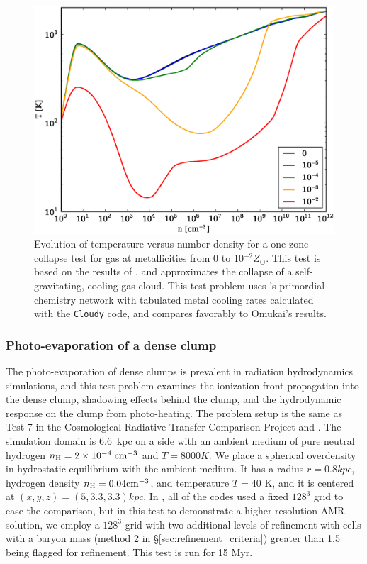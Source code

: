 \begin{figure}
  \begin{center}
    \includegraphics[width=1.0\textwidth]{figures/OneZoneCollapseTest.eps}
  \end{center}
  \caption{Evolution of temperature versus number density for a
one-zone collapse test for gas at metallicities from 0 to 10$^{-2}
Z_{\odot}$.  This test is based on the results of
\citet{2005ApJ...626..627O}, and approximates the collapse of a
self-gravitating, cooling gas cloud.  This test problem uses \enzo's
primordial chemistry network with tabulated metal cooling rates
calculated with the \texttt{Cloudy} code, and compares favorably to
Omukai's results.}
  \label{fig.onezone}
\end{figure}


\subsubsection{Photo-evaporation of a dense clump}
\label{sec.tests.raytracing}

The photo-evaporation of dense clumps is prevalent in radiation
hydrodynamics simulations, and this test problem examines the
ionization front propagation into the dense clump, shadowing effects
behind the clump, and the hydrodynamic response on the clump from
photo-heating.  The problem setup is the same as Test 7 in the
Cosmological Radiative Transfer Comparison Project
\citep{IlievEtAl2009} and \citet{Wise11_Moray}.  The simulation domain
is 6.6~kpc on a side with an ambient medium of pure neutral hydrogen
$n_{\rm H} = 2 \times 10^{-4}\; \cubecm$ and $T = 8000 \unit{K}$.  We
place a spherical overdensity in hydrostatic equilibrium with the
ambient medium.  It has a radius $r = 0.8 \unit{kpc}$, hydrogen
density $n_{\rm H} = 0.04 \cubecm$, and temperature $T = 40$ K, and it
is centered at $(x,y,z) = (5, 3.3, 3.3) \unit{kpc}$.  In
\citet{IlievEtAl2009}, all of the codes used a fixed $128^3$ grid to
ease the comparison, but in this test to demonstrate a higher
resolution AMR solution, we employ a $128^3$ grid with two additional
levels of refinement with cells with a baryon mass (method 2 in
\S\ref{sec:refinement_criteria}) greater than 1.5 being flagged for
refinement.  This test is run for 15 Myr.

